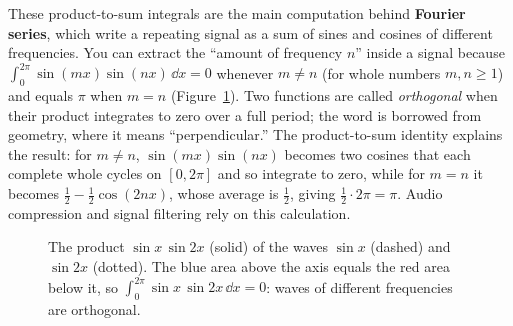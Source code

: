 \begin{connectionbox}
These product-to-sum integrals are the main computation behind \textbf{Fourier
series}, which write a repeating signal as a sum of sines and cosines of
different frequencies. You can extract the ``amount of frequency $n$'' inside a
signal because $\int_0^{2\pi}\sin(mx)\sin(nx)\,\dd x = 0$ whenever $m \neq n$
(for whole numbers $m,n\ge 1$) and equals $\pi$ when $m = n$
(Figure~\ref{ch24:fig-orthogonal}). Two functions are called
\emph{orthogonal} when their product integrates to zero over a full period;
the word is borrowed from geometry, where it means ``perpendicular.'' The
product-to-sum identity explains the result: for $m\ne n$,
$\sin(mx)\sin(nx)$ becomes two cosines that each complete whole cycles on
$[0,2\pi]$ and so integrate to zero, while for $m=n$ it becomes
$\tfrac12 - \tfrac12\cos(2nx)$, whose average is $\tfrac12$, giving
$\tfrac12\cdot 2\pi = \pi$. Audio compression and signal filtering rely on
this calculation.
\end{connectionbox}

\begin{figure}[htbp]
\centering
{}
\caption{The product $\sin x\,\sin 2x$ (solid) of the waves $\sin x$ (dashed)
and $\sin 2x$ (dotted). The blue area above the axis equals the red area below
it, so $\int_0^{2\pi}\sin x\,\sin 2x\,\dd x = 0$: waves of different
frequencies are orthogonal.}
\label{ch24:fig-orthogonal}
\end{figure}

